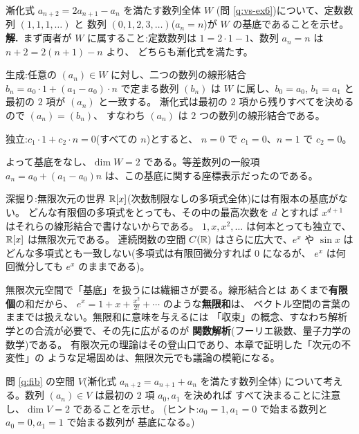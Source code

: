 \begin{rei}[例題・標準(数列の空間の基底)]\label{rei:dim-seq}
漸化式 $a_{n+2} = 2a_{n+1} - a_n$ を満たす数列全体 $W$
(問 \ref{q:vs-ex6})について、定数数列 $(1, 1, 1, \dots)$ と
数列 $(0, 1, 2, 3, \dots)$($a_n = n$)が $W$ の基底であることを示せ。\\
\textbf{解.}\ まず両者が $W$ に属すること:定数数列は
$1 = 2 \cdot 1 - 1$、数列 $a_n = n$ は $n + 2 = 2(n + 1) - n$ より、
どちらも漸化式を満たす。

生成:任意の $(a_n) \in W$ に対し、二つの数列の線形結合
$b_n = a_0 \cdot 1 + (a_1 - a_0) \cdot n$ で定まる数列 $(b_n)$ は
$W$ に属し、$b_0 = a_0$, $b_1 = a_1$ と最初の $2$ 項が $(a_n)$ と一致する。
漸化式は最初の $2$ 項から残りすべてを決めるので $(a_n) = (b_n)$、
すなわち $(a_n)$ は $2$ つの数列の線形結合である。

独立:$c_1 \cdot 1 + c_2 \cdot n = 0$(すべての $n$)とすると、
$n = 0$ で $c_1 = 0$、$n = 1$ で $c_2 = 0$。

よって基底をなし、$\dim W = 2$ である。等差数列の一般項
$a_n = a_0 + (a_1 - a_0)n$ は、この基底に関する座標表示だったのである。
\end{rei}

\begin{itembox}[l]{深掘り:無限次元の世界}
$\mathbb{R}[x]$(次数制限なしの多項式全体)には有限本の基底がない。
どんな有限個の多項式をとっても、その中の最高次数を $d$ とすれば
$x^{d+1}$ はそれらの線形結合で書けないからである。
$1, x, x^2, \dots$ は何本とっても独立で、$\mathbb{R}[x]$ は無限次元である。
連続関数の空間 $C(\mathbb{R})$ はさらに広大で、$e^x$ や $\sin x$ は
どんな多項式とも一致しない(多項式は有限回微分すれば $0$ になるが、
$e^x$ は何回微分しても $e^x$ のままである)。

無限次元空間で「基底」を扱うには繊細さが要る。線形結合とは
あくまで\textbf{有限個}の和だから、
$e^x = 1 + x + \frac{x^2}{2!} + \cdots$ のような\textbf{無限和}は、
ベクトル空間の言葉のままでは扱えない。無限和に意味を与えるには
「収束」の概念、すなわち解析学との合流が必要で、その先に広がるのが
\textbf{関数解析}(フーリエ級数、量子力学の数学)である。
有限次元の理論はその登山口であり、本章で証明した「次元の不変性」の
ような足場固めは、無限次元でも議論の模範になる。
\end{itembox}

\begin{mondai}\label{q:basis2}
問 \ref{q:fib} の空間 $V$(漸化式 $a_{n+2} = a_{n+1} + a_n$ を満たす数列全体)
について考える。数列 $(a_n) \in V$ は最初の $2$ 項 $a_0, a_1$ を決めれば
すべて決まることに注意し、$\dim V = 2$ であることを示せ。
(ヒント:$a_0 = 1, a_1 = 0$ で始まる数列と $a_0 = 0, a_1 = 1$ で始まる数列が
基底になる。)
\end{mondai}


